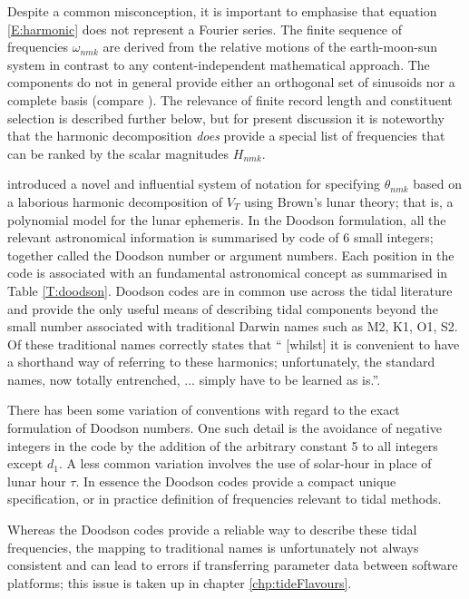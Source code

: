 Despite a common misconception, it is important to emphasise that equation \ref{E:harmonic} does not represent a Fourier series.  The finite sequence of frequencies $\omega_{nmk}$ are derived from the relative motions of the earth-moon-sun system in contrast to any content-independent mathematical approach. 
The components do not in general provide either an orthogonal set of sinusoids nor a complete basis (compare \citet{Briggs_1995}).   The relevance of finite record length and constituent selection is described further below, but for present discussion it is noteworthy that the harmonic decomposition \textit{does} provide a special list of frequencies that can be ranked by the scalar magnitudes $H_{nmk}$. 

\citet{Doodson:1921kt} introduced a novel and influential system of notation for specifying $\theta_{nmk}$ based on a laborious harmonic decomposition of $V_T$ using Brown's lunar theory; that is, a polynomial model for the lunar ephemeris.  
In the Doodson formulation, all the relevant astronomical information is summarised by code of 6 small integers; together called the Doodson number or argument numbers.   Each position in the code is associated with an fundamental astronomical concept as summarised in Table \ref{T:doodson}.  Doodson codes are in common use across the tidal literature and provide the only useful means of describing tidal components beyond the small number associated with traditional Darwin names such as M2, K1, O1, S2.
Of these traditional names \citet{agnew2015} correctly states that `` [whilst] it is convenient to have a shorthand way of referring to these harmonics; unfortunately, the standard names,  now totally entrenched, ... simply have to be learned as is.''.

There has been some variation of conventions with regard to the exact formulation of Doodson numbers.  One such detail is the avoidance of negative integers in the code by the addition of the arbitrary constant 5 to all integers except $d_1$.   A less common variation involves the use of solar-hour in place of lunar hour $\tau$.  
In essence the Doodson codes provide a compact unique specification, or in practice definition of frequencies relevant to tidal methods.

Whereas the Doodson codes provide a reliable way to describe these tidal frequencies, the mapping to traditional names is unfortunately not always consistent and can lead to errors if transferring parameter data between software platforms; this issue is taken up in chapter \ref{chp:tideFlavours}.


